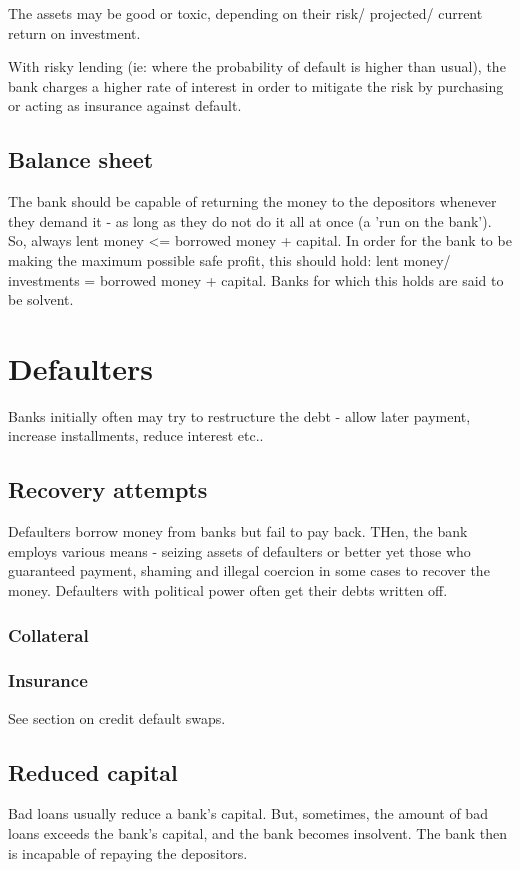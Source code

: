 \documentclass[oneside, article]{memoir}
\begin{document}
The assets may be good or toxic, depending on their risk/ projected/ current return on investment.

With risky lending (ie: where the probability of default is higher than usual), the bank charges a higher rate of interest in order to mitigate the risk by purchasing or acting as insurance against default.

\subsection{Balance sheet}
The bank should be capable of returning the money to the depositors whenever they demand it - as long as they do not do it all at once (a 'run on the bank'). So, always lent money <= borrowed money + capital. In order for the bank to be making the maximum possible safe profit, this should hold: lent money/ investments = borrowed money + capital. Banks for which this holds are said to be solvent.

\section{Defaulters}
Banks initially often may try to restructure the debt - allow later payment, increase installments, reduce interest etc..

\subsection{Recovery attempts}
Defaulters borrow money from banks but fail to pay back. THen, the bank employs various means - seizing assets of defaulters or better yet those who guaranteed payment, shaming and illegal coercion in some cases to recover the money. Defaulters with political power often get their debts written off.

\subsubsection{Collateral}
\tbc

\subsubsection{Insurance}
See section on credit default swaps.

\subsection{Reduced capital}
Bad loans usually reduce a bank's capital. But, sometimes, the amount of bad loans exceeds the bank's capital, and the bank becomes insolvent. The bank then is incapable of repaying the depositors.
\end{document}
